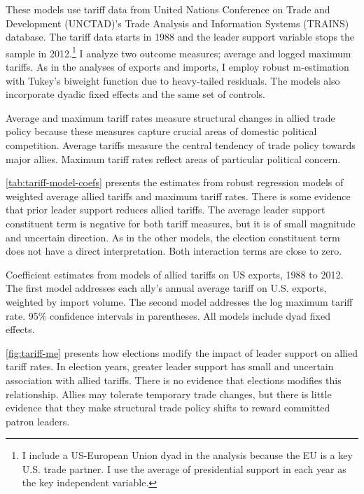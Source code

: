 \documentclass[12pt]{article}
\begin{document}
These models use tariff data from United Nations Conference on Trade and Development (UNCTAD)'s Trade Analysis and Information Systems (TRAINS) database. 
The tariff data starts in 1988 and the leader support variable stops the sample in 2012.\footnote{I include a US-European Union dyad in the analysis because the EU is a key U.S. trade partner. I use the average of presidential support in each year as the key independent variable.}
I analyze two outcome measures; average and logged maximum tariffs. 
As in the analyses of exports and imports, I employ robust m-estimation with Tukey's biweight function due to heavy-tailed residuals.
The models also incorporate dyadic fixed effects and the same set of controls.


Average and maximum tariff rates measure structural changes in allied trade policy because these measures capture crucial areas of domestic political competition.
Average tariffs measure the central tendency of trade policy towards major allies. 
Maximum tariff rates reflect areas of particular political concern.


\autoref{tab:tariff-model-coefs} presents the estimates from robust regression models of weighted average allied tariffs and maximum tariff rates. 
There is some evidence that prior leader support reduces allied tariffs. 
The average leader support constituent term is negative for both tariff measures, but it is of small magnitude and uncertain direction.
As in the other models, the election constituent term does not have a direct interpretation.
Both interaction terms are close to zero. 


\begin{table}
\centering

	\caption{Coefficient estimates from models of allied tariffs on US exports, 1988 to 2012. The first model addresses each ally's annual average tariff on U.S. exports, weighted by import volume. The second model addresses the log maximum tariff rate. 95\% confidence intervals in parentheses. All models include dyad fixed effects.}
	\label{tab:tariff-model-coefs}
\end{table}


\autoref{fig:tariff-me} presents how elections modify the impact of leader support on allied tariff rates.
In election years, greater leader support has small and uncertain association with allied tariffs. 
There is no evidence that elections modifies this relationship.
Allies may tolerate temporary trade changes, but there is little evidence that they make structural trade policy shifts to reward committed patron leaders.
\end{document}
